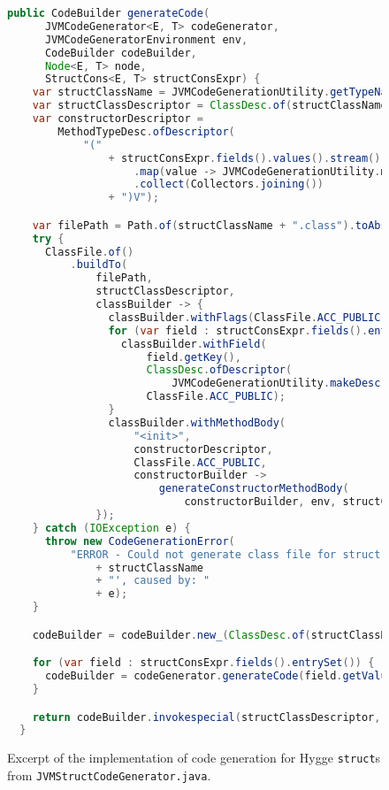 \begin{figure}[H]
  \centering
  \begin{lstlisting}[language=Java]
  public CodeBuilder generateCode(
      JVMCodeGenerator<E, T> codeGenerator,
      JVMCodeGeneratorEnvironment env,
      CodeBuilder codeBuilder,
      Node<E, T> node,
      StructCons<E, T> structConsExpr) {
    var structClassName = JVMCodeGenerationUtility.getTypeName(node.type(), node.env());
    var structClassDescriptor = ClassDesc.of(structClassName);
    var constructorDescriptor =
        MethodTypeDesc.ofDescriptor(
            "("
                + structConsExpr.fields().values().stream()
                    .map(value -> JVMCodeGenerationUtility.makeDescriptor(value.type(), env))
                    .collect(Collectors.joining())
                + ")V");

    var filePath = Path.of(structClassName + ".class").toAbsolutePath();
    try {
      ClassFile.of()
          .buildTo(
              filePath,
              structClassDescriptor,
              classBuilder -> {
                classBuilder.withFlags(ClassFile.ACC_PUBLIC);
                for (var field : structConsExpr.fields().entrySet()) {
                  classBuilder.withField(
                      field.getKey(),
                      ClassDesc.ofDescriptor(
                          JVMCodeGenerationUtility.makeDescriptor(field.getValue().type(), env)),
                      ClassFile.ACC_PUBLIC);
                }
                classBuilder.withMethodBody(
                    "<init>",
                    constructorDescriptor,
                    ClassFile.ACC_PUBLIC,
                    constructorBuilder ->
                        generateConstructorMethodBody(
                            constructorBuilder, env, structConsExpr, structClassName));
              });
    } catch (IOException e) {
      throw new CodeGenerationError(
          "ERROR - Could not generate class file for struct '"
              + structClassName
              + "', caused by: "
              + e);
    }

    codeBuilder = codeBuilder.new_(ClassDesc.of(structClassName)).dup();

    for (var field : structConsExpr.fields().entrySet()) {
      codeBuilder = codeGenerator.generateCode(field.getValue(), env, codeBuilder);
    }

    return codeBuilder.invokespecial(structClassDescriptor, "<init>", constructorDescriptor);
  }
  \end{lstlisting}
  \caption{Excerpt of the implementation of code generation for Hygge \texttt{struct}s from \texttt{JVMStructCodeGenerator.java}.}
  \label{fig:jvm_struct_builder}
\end{figure}

